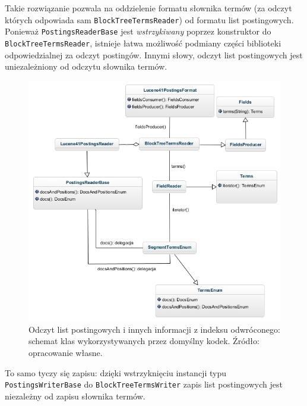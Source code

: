 Takie rozwiązanie pozwala na oddzielenie formatu słownika termów (za odczyt których odpowiada sam \texttt{BlockTreeTermsReader}) od formatu list postingowych. Ponieważ \texttt{PostingsReaderBase} jest \emph{wstrzykiwany} poprzez konstruktor do \texttt{BlockTreeTermsReader}, istnieje łatwa możliwość podmiany części biblioteki odpowiedzialnej za odczyt postingów. Innymi słowy, odczyt list postingowych jest uniezależniony od odczytu słownika termów.

\begin{figure}[here]
 \includegraphics[scale=0.62]{pictures/Lucene41PostingsFormatRead_1.jpg}
 \caption{Odczyt list postingowych i innych informacji z indeksu odwróconego: schemat klas wykorzystywanych przez domyślny kodek. Źródło: opracowanie własne. \label{fig:postingFormatRead}}
\end{figure}

To samo tyczy się zapisu: dzięki wstrzyknięciu instancji typu \texttt{PostingsWriterBase} do \texttt{BlockTreeTermsWriter} zapis list postingowych jest niezależny od zapisu słownika termów.

